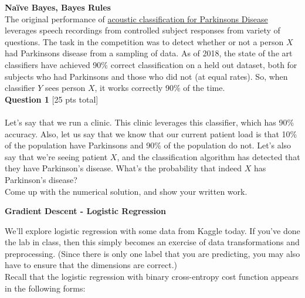 \documentclass[paper=a4, fontsize=11pt]{scrartcl} %
\author{
    \textbf{YOUR NAME} \\ 
    \textbf{YOUR GIT USERNAME} \\ 
    \textbf{YOUR E-MAIL}
}%
\begin{document}
\maketitle %

{\huge \textbf{Na\"ive Bayes, Bayes Rules}} \\

The original performance of \href{https://www.ncbi.nlm.nih.gov/pmc/articles/PMC6339026/}{acoustic classification for Parkinsons Disease} leverages speech recordings from controlled subject responses from variety of questions. The task in the competition was to detect whether or not a person $X$ had Parkinsons disease from a sampling of data. As of 2018, the state of the art classifiers have achieved 90\% correct classification on a held out dataset, both for subjects who had Parkinsons and those who did not (at equal rates). So, when classifier $Y$ sees person $X$, it works correctly 90\% of the time. \\

{\Large \textbf{Question 1} [25 pts total]} \\
\\
Let's say that we run a clinic. This clinic leverages this classifier, which has 90\% accuracy. Also, let us say that we know that our current patient load is that 10\% of the population have Parkinsons and 90\% of the population do not. Let's also say that we're seeing patient $X$, and the classification algorithm has detected that they have Parkinson's disease. What's the probability that indeed $X$ has Parkinson's disease? \\

Come up with the numerical solution, and show your written work.

\vspace{1.5cm}
{\huge \textbf{Gradient Descent - Logistic Regression}}
\vspace{3mm}

We'll explore logistic regression with some data from Kaggle today. If you've done the lab in class, then this simply becomes an exercise of data transformations and preprocessing. (Since there is only one label that you are predicting, you may also have to ensure that the dimensions are correct.) \\

Recall that the logistic regression with binary cross-entropy cost function appears in the following forms: \\
\end{document}
